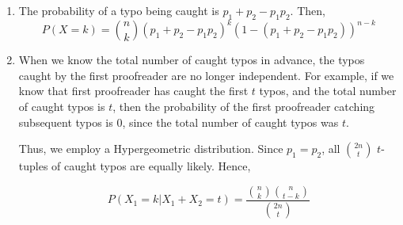 \begin{enumerate}[label=(\alph*)]
\item The probability of a typo being caught is $p_{1} + p_{2} - p_{1}p_{2}$.
Then, $$P(X = k) = \binom{n}{k}(p_{1} + p_{2} - p_{1}p_{2})^{k}(1 - (p_{1} + p_
{2} - p_{1}p_{2}))^{n-k}$$

\item When we know the total number of caught typos in advance, the typos caught
by the first proofreader are no longer independent. For example, if we know that
first proofreader has caught the first $t$ typos, and the total number of caught
typos is $t$, then the probability of the first proofreader catching subsequent
typos is $0$, since the total number of caught typos was $t$.

Thus, we employ a Hypergeometric distribution. Since $p_{1} = p_{2}$, all $\binom{2n}{t}$ $t$-tuples of caught typos are equally likely. Hence,

$$P(X_{1} = k | X_{1} + X_{2} = t) = \frac{\binom{n}{k}\binom{n}{t-k}}{
\binom{2n}{t}}$$
\end{enumerate}